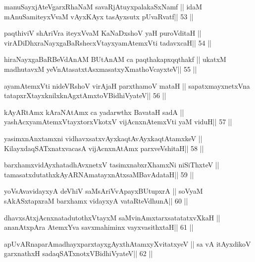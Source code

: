 \begin{shl}
manuSayxjAteVgarxRhaNaM savaRjAtuyxpalakaSxNamf ||
idaM mAnuSamiteyxVvaM vAyxKAyx tasAyxsutx pUvaRvatf\hfill || 53 ||
\end{shl}

\begin{shl}
paqthiviV shAriVra iteyxVvaM KaNaDxshoV yaH puroVditaH ||
virADiDhxraNayxgaBaRshecxVtayxyamAtemxVti tadavxcaH\hfill || 54 ||
\end{shl}

\begin{shl}
hiraNayxgaBaRBeVdAnAM BUtAnAM ca paqthakapxqqthakf ||
ukatxM madhutavxM yeVnAtasatxtAsxmasatxyXmathoVcayxteV\hfill || 55 ||
\end{shl}

\begin{shl}
ayamAtemxVti nideVRshoV virAjaH parxthamoV mataH ||
sapatxmayxnetxVna tatapxrXtayxknilxknAgxtAmx\s toV\s BidhiVyateV\hfill || 56 ||
\end{shl}

\begin{shl}
kAyARtAmx kAraNAtAmx ca yadarwthx BavataH sadA ||
yashAcxyamAtemxVtayxtorxVkotxV vijAcnxnAtemxVti yaM viduH\hfill || 57 ||
\end{shl}

\begin{shl}
yasimxnAnxtamxni vidhavxsatxvAyxkaqtAvAyxkaqtAtamxkeV ||
KilayxdaqSATxnatxvacasA vijAcnxnAtAmx parxveVshitaH\hfill || 58 ||
\end{shl}

\begin{shl}
barxhamxvidAyxhatadhAvxnetxV tasimxnabxrXhamxNi niSiThxteV ||
tamasatxdutathxkAyARNAmatayxnAtxsaMBavAdataH\hfill || 59 ||
\end{shl}

\begin{shl}
yoV\s sAvavidayxyA deVhiV saMsAriVvApayxBUtupxrA ||
soV\s yaM sAkASxtapxraM barxhamx vidayxyA vataRteV\s dhunA\hfill || 60 ||
\end{shl}

\begin{shl}
dhavxsAtxjAcnxnatadutothxVtayxM saMvinAmxtarxsatatatxvXkaH ||
ananAtxpAra AtemxYva savxmahiminx vayxvasithxtaH\hfill || 61 ||
\end{shl}

\begin{shl}
apUvARnaparAmadhayxparxtayxgAyxthAtamxyXvitatxyeV ||
sa vA itAyxdikoV garxnathxH sadaqSATxnotxV\s BidhiVyateV\hfill || 62 ||
\end{shl}

